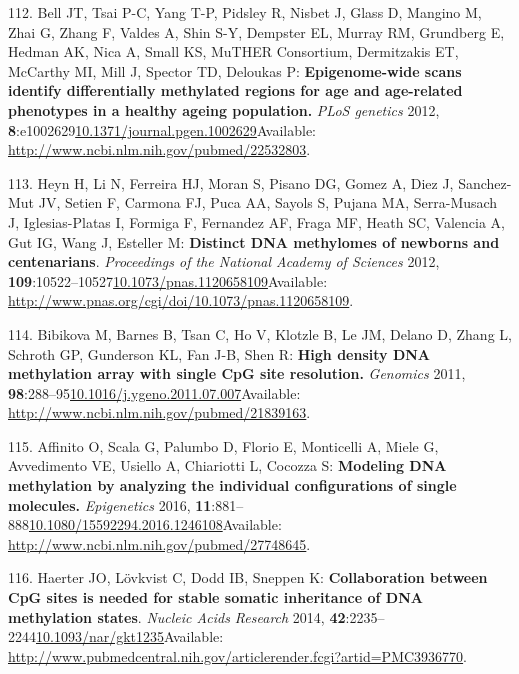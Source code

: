 \documentclass[
]{book}
\begin{document}
\leavevmode\hypertarget{ref-Bell2012}{}%
112. Bell JT, Tsai P-C, Yang T-P, Pidsley R, Nisbet J, Glass D, Mangino M, Zhai G, Zhang F, Valdes A, Shin S-Y, Dempster EL, Murray RM, Grundberg E, Hedman AK, Nica A, Small KS, MuTHER Consortium, Dermitzakis ET, McCarthy MI, Mill J, Spector TD, Deloukas P: \textbf{Epigenome-wide scans identify differentially methylated regions for age and age-related phenotypes in a healthy ageing population.} \emph{PLoS genetics} 2012, \textbf{8}:e1002629\href{https://doi.org/10.1371/journal.pgen.1002629}{10.1371/journal.pgen.1002629}Available: \url{http://www.ncbi.nlm.nih.gov/pubmed/22532803}.

\leavevmode\hypertarget{ref-Heyn2012}{}%
113. Heyn H, Li N, Ferreira HJ, Moran S, Pisano DG, Gomez A, Diez J, Sanchez-Mut JV, Setien F, Carmona FJ, Puca AA, Sayols S, Pujana MA, Serra-Musach J, Iglesias-Platas I, Formiga F, Fernandez AF, Fraga MF, Heath SC, Valencia A, Gut IG, Wang J, Esteller M: \textbf{Distinct DNA methylomes of newborns and centenarians}. \emph{Proceedings of the National Academy of Sciences} 2012, \textbf{109}:10522--10527\href{https://doi.org/10.1073/pnas.1120658109}{10.1073/pnas.1120658109}Available: \url{http://www.pnas.org/cgi/doi/10.1073/pnas.1120658109}.

\leavevmode\hypertarget{ref-Bibikova2011}{}%
114. Bibikova M, Barnes B, Tsan C, Ho V, Klotzle B, Le JM, Delano D, Zhang L, Schroth GP, Gunderson KL, Fan J-B, Shen R: \textbf{High density DNA methylation array with single CpG site resolution.} \emph{Genomics} 2011, \textbf{98}:288--95\href{https://doi.org/10.1016/j.ygeno.2011.07.007}{10.1016/j.ygeno.2011.07.007}Available: \url{http://www.ncbi.nlm.nih.gov/pubmed/21839163}.

\leavevmode\hypertarget{ref-Affinito2016}{}%
115. Affinito O, Scala G, Palumbo D, Florio E, Monticelli A, Miele G, Avvedimento VE, Usiello A, Chiariotti L, Cocozza S: \textbf{Modeling DNA methylation by analyzing the individual configurations of single molecules.} \emph{Epigenetics} 2016, \textbf{11}:881--888\href{https://doi.org/10.1080/15592294.2016.1246108}{10.1080/15592294.2016.1246108}Available: \url{http://www.ncbi.nlm.nih.gov/pubmed/27748645}.

\leavevmode\hypertarget{ref-Haerter2014}{}%
116. Haerter JO, Lövkvist C, Dodd IB, Sneppen K: \textbf{Collaboration between CpG sites is needed for stable somatic inheritance of DNA methylation states}. \emph{Nucleic Acids Research} 2014, \textbf{42}:2235--2244\href{https://doi.org/10.1093/nar/gkt1235}{10.1093/nar/gkt1235}Available: \url{http://www.pubmedcentral.nih.gov/articlerender.fcgi?artid=PMC3936770}.
\end{document}
